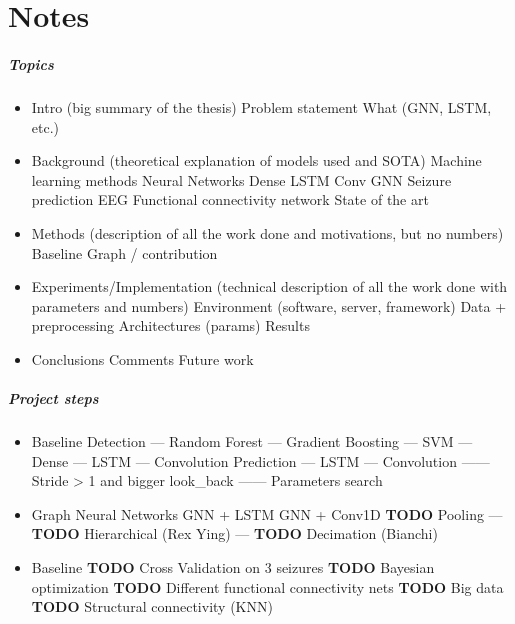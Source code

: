 
\chapter*{Notes}

\paragraph{Topics}
\begin{itemize}
    \item Intro (big summary of the thesis)
    \subitem Problem statement
    \subitem What (GNN, LSTM, etc.)
    \item Background (theoretical explanation of models used and SOTA)
    \subitem Machine learning methods
    \subitem Neural Networks
    \subitem Dense
    \subitem LSTM
    \subitem Conv
    \subitem GNN
    \subitem Seizure prediction
    \subitem EEG
    \subitem Functional connectivity network
    \subitem State of the art
    \item Methods (description of all the work done and motivations, but no numbers)
    \subitem Baseline
    \subitem Graph / contribution
    \item Experiments/Implementation (technical description of all the work done with parameters and numbers)
    \subitem Environment (software, server, framework)
    \subitem Data + preprocessing
    \subitem Architectures (params)
    \subitem Results
    \item Conclusions
    \subitem Comments
    \subitem Future work
\end{itemize}

\paragraph{Project steps}
\begin{itemize}
    \item Baseline
    \subitem Detection
    \subitem --- Random Forest
    \subitem --- Gradient Boosting
    \subitem --- SVM
    \subitem --- Dense
    \subitem --- LSTM
    \subitem --- Convolution
    \subitem Prediction
    \subitem --- LSTM
    \subitem --- Convolution
    \subitem ------ Stride > 1 and bigger look\_back
    \subitem ------ Parameters search
    \item Graph Neural Networks
    \subitem GNN + LSTM
    \subitem GNN + Conv1D
    \subitem \textbf{TODO} Pooling
    \subitem --- \textbf{TODO} Hierarchical (Rex Ying)
    \subitem --- \textbf{TODO} Decimation (Bianchi)
    \item Baseline
    \subitem \textbf{TODO} Cross Validation on 3 seizures
    \subitem \textbf{TODO} Bayesian optimization
    \subitem \textbf{TODO} Different functional connectivity nets
    \subitem \textbf{TODO} Big data
    \subitem \textbf{TODO} Structural connectivity (KNN)
\end{itemize}


